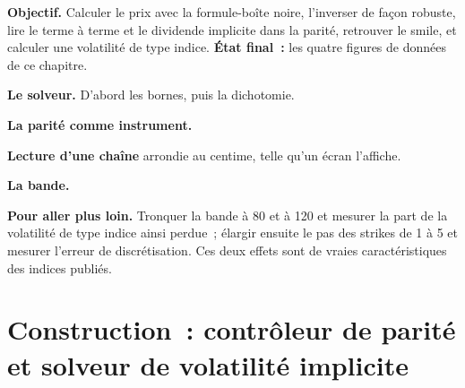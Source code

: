 \begin{tutorial}
\textbf{Objectif.} Calculer le prix avec la formule-boîte noire, l'inverser de façon robuste, lire le
terme à terme et le dividende implicite dans la parité, retrouver le smile, et calculer une
volatilité de type indice. \textbf{État final~:} les quatre figures de données de ce
chapitre.
\begin{tutsteps}
\item \textbf{Le solveur.} D'abord les bornes, puis la dichotomie.
\label{lst:m1:volatility-first-contact:solver}
\item \textbf{La parité comme instrument.}
\label{lst:m1:volatility-first-contact:parity}
\item \textbf{Lecture d'une chaîne} arrondie au centime, telle qu'un écran l'affiche.
\label{lst:m1:volatility-first-contact:read}
\item \textbf{La bande.}
\label{lst:m1:volatility-first-contact:strip}
\end{tutsteps}
\textbf{Pour aller plus loin.} Tronquer la bande à 80 et à 120 et mesurer la part de la volatilité
de type indice ainsi perdue~; élargir ensuite le pas des strikes de 1 à 5 et mesurer l'erreur de
discrétisation. Ces deux effets sont de vraies caractéristiques
des indices publiés.
\end{tutorial}

\section{Construction~: contrôleur de parité et solveur de volatilité implicite}\label{bld:m1:volatility-first-contact:parity}

